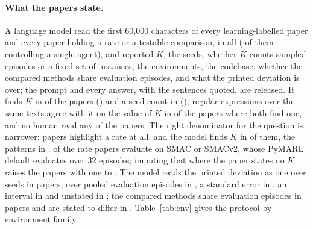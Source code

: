 \documentclass[sigconf,anonymous]{aamas}
\begin{document}
\paragraph{What the papers state.} A language model read the first
60,000 characters of every learning-labelled paper and every paper holding
a rate or a testable comparison, \nPtwoPapers{} in all
(\nPtwoAgentsSingle{} of them controlling a single agent), and reported $K$, the seeds,
whether $K$ counts sampled episodes or a fixed set of instances, the
environments, the codebase, whether the compared methods share evaluation
episodes, and what the printed deviation is over; the prompt and every
answer, with the sentences quoted, are released. It finds $K$ in
\nPtwoWithK{} of the \nPtwoPapers{} papers (\nPtwoWithKPct{}) and a seed
count in \nPtwoWithSeeds{} (\nPtwoWithSeedsPct{}); regular expressions
over the same texts agree with it on the value of $K$ in
\nPtwoRegexAgreeK{} of the \nPtwoRegexBothK{} papers where both find one,
and no human read any of the papers. The right
denominator for the question is narrower: \nPtwoRatePapers{} papers
highlight a rate at all, and the model finds $K$ in
\nPtwoRatePapersWithK{} of them, the patterns in
\nPtwoRatePapersRegexK{}. \nPtwoRatePapersSmac{} of the rate papers
evaluate on SMAC or SMACv2, whose PyMARL default evaluates over 32
episodes; imputing that where the paper states no $K$ raises the papers
with one to \nPtwoRatePapersWithKInherited{}. The
model reads the printed deviation as one over seeds in
\nPtwoSdOverSeeds{} papers, over pooled evaluation episodes in
\nPtwoSdOverEpisodes{}, a standard error in \nPtwoSdOverSe{}, an interval
in \nPtwoSdOverCi{} and unstated in \nPtwoSdOverUnsure{}; the compared methods share evaluation
episodes in \nPtwoSharesEvalYes{} papers and are stated to differ in
\nPtwoSharesEvalNo{}. Table~\ref{tab:env} gives the protocol by
environment family.
\end{document}

